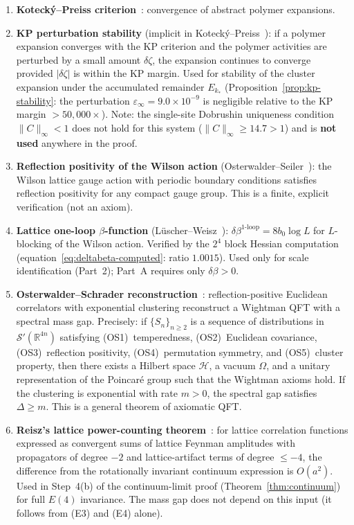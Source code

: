 \documentclass[11pt]{article}
\theoremstyle{definition}
\newcommand{\R}{\mathbb{R}}
\begin{document}
\begin{enumerate}[nosep,label=(E\arabic*)]
\item \textbf{Koteck\'y--Preiss criterion}~\cite{KP}: convergence of
abstract polymer expansions.
\item \textbf{KP perturbation stability}
(implicit in Koteck\'y--Preiss~\cite{KP}):
if a polymer expansion converges with the KP criterion
and the polymer activities are perturbed by a small amount
$\delta\zeta$, the expansion continues to converge provided
$|\delta\zeta|$ is within the KP margin.
Used for stability of the cluster expansion under the
accumulated remainder $E_{k_*}$
(Proposition~\ref{prop:kp-stability}: the perturbation
$\varepsilon_\infty=9.0\times 10^{-9}$ is negligible
relative to the KP margin $>50{,}000\times$).
Note: the single-site Dobrushin uniqueness condition
$\|C\|_\infty<1$ does not hold for this system
($\|C\|_\infty\ge 14.7>1$) and is \textbf{not used}
anywhere in the proof.
\item \textbf{Reflection positivity of the Wilson action}
(Osterwalder--Seiler~\cite{OS78}): the Wilson lattice gauge
action with periodic boundary conditions satisfies reflection
positivity for any compact gauge group.  This is a finite,
explicit verification (not an axiom).
\item \textbf{Lattice one-loop $\beta$-function}
(L\"uscher--Weisz~\cite{Luscher82}):
$\delta\beta^{1\text{-loop}}=8b_0\log L$ for $L$-blocking
of the Wilson action.  Verified by the $2^4$ block Hessian
computation (equation~\eqref{eq:deltabeta-computed}:
ratio $1.0015$).  Used only for scale identification
(Part~2); Part~A requires only $\delta\beta>0$.
\item \textbf{Osterwalder--Schrader reconstruction}~\cite{OS73}:
reflection-positive Euclidean correlators with exponential
clustering reconstruct a Wightman QFT with a spectral
mass gap.  Precisely: if $\{S_n\}_{n\ge 2}$ is a sequence
of distributions in $\mathcal{S}'(\R^{4n})$ satisfying
(OS1)~temperedness, (OS2)~Euclidean covariance,
(OS3)~reflection positivity, (OS4)~permutation symmetry,
and (OS5)~cluster property, then there exists a Hilbert space
$\mathcal{H}$, a vacuum $\Omega$, and a unitary representation
of the Poincar\'e group such that the Wightman axioms hold.
If the clustering is exponential with rate $m>0$, the spectral
gap satisfies $\Delta\ge m$.  This is a general theorem of
axiomatic QFT.
\item \textbf{Reisz's lattice power-counting theorem}~\cite{Reisz1988,Reisz89}:
for lattice correlation functions expressed as convergent
sums of lattice Feynman amplitudes with propagators of
degree $-2$ and lattice-artifact terms of degree $\le -4$,
the difference from the rotationally invariant continuum
expression is $O(a^2)$.  Used in Step~4(b) of the
continuum-limit proof (Theorem~\ref{thm:continuum}) for
full $E(4)$ invariance.  The mass gap does not
depend on this input (it follows from (E3) and (E4) alone).
\end{enumerate}
\end{document}
